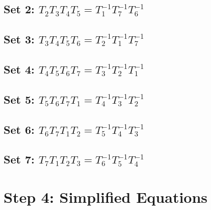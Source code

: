 \documentclass[12pt, a4paper]{article}
\begin{document}
\subsection*{Set 2: $T_{2}T_{3}T_{4}T_{5} = T_{1}^{-1}T_{7}^{-1}T_{6}^{-1}$}
\subsection*{Set 3: $T_{3}T_{4}T_{5}T_{6} = T_{2}^{-1}T_{1}^{-1}T_{7}^{-1}$}
\subsection*{Set 4: $T_{4}T_{5}T_{6}T_{7} = T_{3}^{-1}T_{2}^{-1}T_{1}^{-1}$}
\subsection*{Set 5: $T_{5}T_{6}T_{7}T_{1} = T_{4}^{-1}T_{3}^{-1}T_{2}^{-1}$}
\subsection*{Set 6: $T_{6}T_{7}T_{1}T_{2} = T_{5}^{-1}T_{4}^{-1}T_{3}^{-1}$}
\subsection*{Set 7: $T_{7}T_{1}T_{2}T_{3} = T_{6}^{-1}T_{5}^{-1}T_{4}^{-1}$}


\section{Step 4: Simplified Equations}
\end{document}
